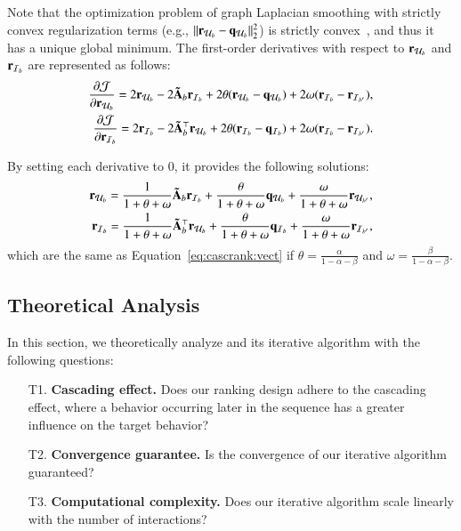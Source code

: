Note that the optimization problem of graph Laplacian smoothing with strictly convex regularization terms (e.g., $\lVert \mathbf{r}_{\mathcal{U}_{b}} - \mathbf{q}_{\mathcal{U}_{b}} \rVert_{2}^{2}$) is strictly convex~\cite{HeHGKW17}, and thus it has a unique global minimum.
The first-order derivatives with respect to $\mathbf{r}_{\mathcal{U}_{b}}$ and $\mathbf{r}_{\mathcal{I}_{b}}$ are represented as follows: 
\begin{align*}
    \begin{split}
    \frac{\partial\mathcal{J}}{\partial\mathbf{r}_{\mathcal{U}_{b}}} = 
    2\mathbf{r}_{\mathcal{U}_{b}} - 2\mathbf{\tilde{A}}_{b}\mathbf{r}_{\mathcal{I}_{b}} + 2\theta (\mathbf{r}_{\mathcal{U}_{b}} - \mathbf{q}_{\mathcal{U}_{b}}) + 2\omega(\mathbf{r}_{\mathcal{I}_{b}} - \mathbf{r}_{\mathcal{I}_{b'}}), \\
    \frac{\partial\mathcal{J}}{\partial\mathbf{r}_{\mathcal{I}_{b}}} = 
    2\mathbf{r}_{\mathcal{I}_{b}} - 2\mathbf{\tilde{A}}_{b}^{\top}\mathbf{r}_{\mathcal{U}_{b}} + 2\theta (\mathbf{r}_{\mathcal{I}_{b}} - \mathbf{q}_{\mathcal{I}_{b}}) + 2\omega(\mathbf{r}_{\mathcal{I}_{b}} - \mathbf{r}_{\mathcal{I}_{b'}}).
    \end{split}
\end{align*}

By setting each derivative to $0$, it provides the following solutions:
\begin{align*}
    \begin{split}
        \mathbf{r}_{\mathcal{U}_{b}} = \frac{1}{1+\theta+\omega}\mathbf{\tilde{A}}_{b}\mathbf{r}_{\mathcal{I}_{b}} + 
        \frac{\theta}{1+\theta+\omega}\mathbf{q}_{\mathcal{U}_{b}} + \frac{\omega}{1+\theta+\omega}\mathbf{r}_{\mathcal{U}_{b'}}, \\
        \mathbf{r}_{\mathcal{I}_{b}} = \frac{1}{1+\theta+\omega}\mathbf{\tilde{A}}_{b}^{\top}\mathbf{r}_{\mathcal{U}_{b}} + 
        \frac{\theta}{1+\theta+\omega}\mathbf{q}_{\mathcal{I}_{b}} + \frac{\omega}{1+\theta+\omega}\mathbf{r}_{\mathcal{I}_{b'}},
    \end{split}
\end{align*}
which are the same as Equation~\eqref{eq:cascrank:vect} if $\theta=\frac{\alpha}{1-\alpha-\beta}$ and $\omega = \frac{\beta}{1-\alpha-\beta}$.

\subsection{Theoretical Analysis}
\label{sec:proposed:analysis}
In this section, we theoretically analyze \method and its iterative algorithm with the following questions:
\begin{enumerate}[leftmargin=9mm,noitemsep]
    \item[T1.] {
        \textbf{Cascading effect.}
        Does our ranking design adhere to the cascading effect, where a behavior occurring later in the sequence has a greater influence on the target behavior?
    }
    \item[T2.] {
        \textbf{Convergence guarantee.}
        Is the convergence of our iterative algorithm guaranteed? 
    }
    \item[T3.] { 
        \textbf{Computational complexity.} Does our iterative algorithm scale linearly with the number of interactions?
    }
\end{enumerate}

